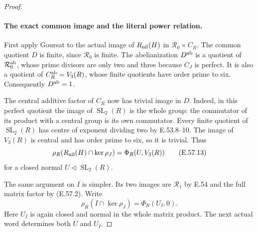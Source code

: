 \begin{proof}
\paragraph{The exact common image and the literal power relation.}
First apply Goursat to the actual image of
$R_{\rm nil}(H)$ in $\mathcal R_0\times C_R$.
The common quotient $D$ is finite, since
$\mathcal R_0$ is finite.  The abelianization
$D^{\rm ab}$ is a quotient of
$\mathcal R_0^{\rm ab}$, whose prime divisors
are only two and three because $C_J$ is perfect.
It is also a quotient of $C_R^{\rm ab}=V_3(R)$,
whose finite quotients have order prime to six.
Consequently $D^{\rm ab}=1$.

The central additive factor of $C_R$ now has
trivial image in $D$.  Indeed, in this perfect
quotient the image of $\operatorname{SL}_2(R)$
is the whole group: the commutator of its product
with a central group is its own commutator.
Every finite quotient of $\operatorname{SL}_2(R)$
has centre of exponent dividing two by E.53.8--10.
The image of $V_3(R)$ is central and has order
prime to six, so it is trivial.  Thus
\[
 \rho_R(R_{\rm nil}(H)\cap\ker\rho_J)
                         =\Phi_R(U,V_3(R))
 \tag{E.57.13}
\]
for a closed normal $U\triangleleft\operatorname{SL}_2(R)$.

The same argument on $I$ is simpler.  Its two
images are $\mathcal R_1$ by E.54 and the full
matrix factor by \textup{(E.57.2)}.  Write
\[
       \rho_R(I\cap\ker\rho_J)=\Phi_R(U_I,0).
 \tag{E.57.14}
\]
Here $U_I$ is again closed and normal in the whole
matrix product.  The next actual word determines
both $U$ and $U_I$.


\end{proof}
